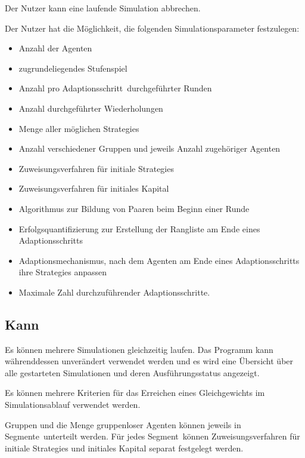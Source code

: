 \documentclass[parskip=full,11pt]{scrartcl}
\def\adapt{Adaptionsschritt}
\def\adapts{Adaptionsschritte}
\def\segment{Segment}
\def\segments{Segmente}
\begin{document}

Der \Gls{Nutzer} kann eine laufende Simulation abbrechen.


Der \Gls{Nutzer} hat die Möglichkeit, die folgenden Simulationsparameter festzulegen:
\begin{itemize} \itemsep -10pt
\item Anzahl der Agenten
\item zugrundeliegendes \Gls{Stufenspiel}
\item Anzahl pro \adapt\ durchgeführter Runden
\item Anzahl durchgeführter Wiederholungen
\item Menge aller möglichen \Glspl{Strategie}
\item Anzahl verschiedener Gruppen und jeweils Anzahl zugehöriger Agenten
\item Zuweisungsverfahren für initiale \Glspl{Strategie}
\item Zuweisungsverfahren für initiales \Gls{Kapital}
\item Algorithmus zur Bildung von Paaren beim Beginn einer Runde
\item Erfolgsquantifizierung zur Erstellung der Rangliste am Ende eines \adapt s
\item Adaptionsmechanismus, nach dem Agenten am Ende eines \adapt s ihre \Glspl{Strategie} anpassen
\item Maximale Zahl durchzuführender \adapts.
\end{itemize}

\subsection{Kann}

Es können mehrere Simulationen gleichzeitig laufen. Das Programm kann währenddessen unverändert verwendet werden und es wird eine Übersicht über alle gestarteten Simulationen und deren Ausführungsstatus angezeigt.

Es können mehrere Kriterien für das Erreichen eines \Gls{Gleichgewicht}s im Simulationsablauf verwendet werden.

Gruppen und die Menge \gls{gruppenloser Agent}en können jeweils in \segments\ unterteilt werden. Für jedes \segment\ können Zuweisungsverfahren für initiale \Glspl{Strategie} und initiales \Gls{Kapital} separat festgelegt werden.
\end{document}
